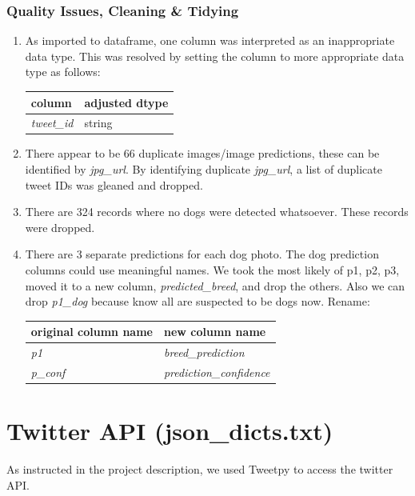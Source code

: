 \documentclass[10pt,a4paper]{report}
\begin{document}
		\subsubsection{Quality Issues, Cleaning \& Tidying}
			\begin{enumerate}
				\item As imported to dataframe, one column was  interpreted as an inappropriate data type. This was resolved by setting 
				the column to more appropriate data type as follows:\\
					\begin{tabular}{ll}
						\toprule
						\textbf{column} & \textbf{adjusted dtype} \\
						\midrule
						\textit{tweet\_id} & string \\
					\end{tabular}
				\item There appear to be 66 duplicate images/image predictions, these can be identified by \textit{jpg\_url}.
				By identifying duplicate \textit{jpg\_url}, a list of duplicate tweet IDs was gleaned and dropped.
				\item There are 324 records where no dogs were detected whatsoever. These records were dropped.
				\item There are 3 separate predictions for each dog photo. The dog prediction columns could use meaningful names. We 
				took the most likely of p1, p2, p3, moved it to a new column, \textit{predicted\_breed}, and drop the others. Also we can drop \textit{p1\_dog} because know all are 
				suspected to be dogs now. Rename:\\
					\begin{tabular}{ll}
						\toprule
						\textbf{original column name} & \textbf{new column name} \\
						\midrule
						\textit{p1} & \textit{breed\_prediction}  \\
						\textit{p\_conf} & \textit{prediction\_confidence}  \\						
					\end{tabular}
			\end{enumerate}

\section{Twitter API (\textbf{json\_dicts.txt})}

As instructed in the project description, we used Tweetpy to access the twitter API. 
\end{document}
